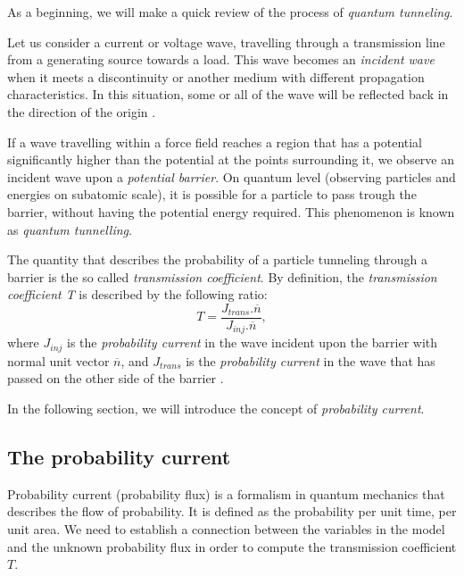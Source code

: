 \documentclass[12pt,a4paper,onecolumn]{article}
\theoremstyle{definition}
\theoremstyle{plain}
\begin{document}
As a beginning, we  will make a quick review of the process of \textit{quantum tunneling}.

Let us consider a current or voltage wave, travelling through a transmission line from a generating source towards a load. This wave becomes an \textit{incident wave} when it meets a discontinuity or another medium with different propagation characteristics. In this situation, some or all of the wave will be reflected back in the direction of the origin \cite{IncidentWave}.

If a wave travelling within a force field reaches a region that has a potential significantly higher than the potential at the points surrounding it, we observe an incident wave upon a \textit{potential barrier}. On quantum level (observing particles and energies on subatomic scale), it is possible for a particle to pass trough the barrier, without having the potential energy required. This phenomenon is known as \textit{quantum tunnelling}.

The quantity that describes the probability of a particle tunneling through a barrier is the so called \textit{transmission coefficient}. By definition, the \textit{transmission coefficient T} is described by the following ratio:
\begin{equation*}
        T=\frac{J_{trans}.\overline{n}}{J_{inj}.\overline{n}},
\end{equation*}
where $J_{inj}$ is the \textit{probability current} in the wave incident upon the barrier with normal unit vector $\overline{n}$, and $J_{trans}$ is the \textit{probability current} in the wave that has passed on the other side of the barrier \cite{wikiTransmCoeff}.

In the following section, we will introduce the concept of \textit{probability current}.


\subsection{The probability current}
Probability current (probability flux) is a formalism in quantum mechanics that describes the flow of probability. It is defined as the probability per unit time, per unit area. 
We need to establish a connection between the variables in the model and the unknown probability flux in order to compute the transmission coefficient $T$.
\end{document}
